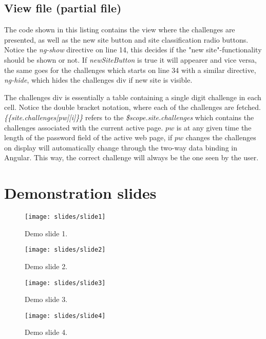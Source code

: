 \section{View file (partial file)}\label{app:view}

The code shown in this listing contains the view where the challenges are presented, as well as the new site button and site classification radio buttons. Notice the \emph{ng-show} directive on line 14, this decides if the "new site"-functionality should be shown or not. If \emph{newSiteButton} is true it will appearer and vice versa, the same goes for the challenges which starts on line 34 with a similar directive, \emph{ng-hide}, which hides the challenges div if new site is visible.  
\par The challenges div is essentially a table containing a single digit challenge in each cell. Notice the double bracket notation, where each of the challenges are fetched. \emph{\{\{site.challenges[pw][i]\}\}} refers to the \emph{\$scope.site.challenges} which contains the challenges associated with the current active page. $pw$ is at any given time the length of the password field of the active web page, if $pw$ changes the challenges on display will automatically change through the two-way data binding in Angular. This way, the correct challenge will always be the one seen by the user.


\chapter{Demonstration slides}\label{demo-slides}

\begin{figure}
    \texttt{[image: slides/slide1]}
    \caption{Demo slide 1.}
    \label{slide1}
\end{figure}


\begin{figure}
    \texttt{[image: slides/slide2]}
    \caption{Demo slide 2.}
    \label{slide2}
\end{figure}


\begin{figure}
    \texttt{[image: slides/slide3]}
    \caption{Demo slide 3.}
    \label{slide3}
\end{figure}


\begin{figure}
    \texttt{[image: slides/slide4]}
    \caption{Demo slide 4.}
    \label{slide4}
\end{figure}

